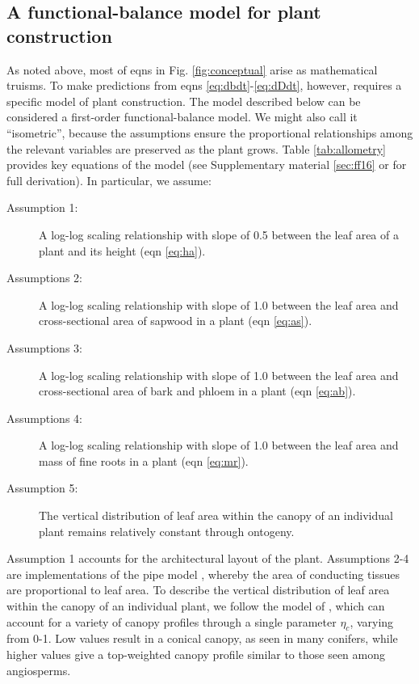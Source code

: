 \documentclass[a4paper,11pt]{article}
\begin{document}
\subsection{A functional-balance model for plant construction}

As noted above, most of eqns in Fig. \ref{fig:conceptual} arise as mathematical truisms. To make predictions from eqns \ref{eq:dbdt}-\ref{eq:dDdt}, however, requires a specific model of plant construction. The model described below can be considered a first-order functional-balance model. We might also call it ``isometric'', because the assumptions ensure the proportional relationships among the relevant variables are preserved as the plant grows. Table \ref{tab:allometry} provides key equations of the model (see Supplementary material \ref{sec:ff16} or \citet{Falster-2016} for full derivation). In particular, we assume:
\begin{description}
\item[Assumption 1:] A log-log scaling relationship with slope of 0.5 between the leaf area of a plant and its height (eqn \ref{eq:ha}).
\item[Assumptions 2:] A log-log scaling relationship with slope of 1.0 between the leaf area and cross-sectional area of sapwood in a plant (eqn \ref{eq:as}).
\item[Assumptions 3:] A log-log scaling relationship with slope of 1.0 between the leaf area and cross-sectional area of bark and phloem in a plant (eqn \ref{eq:ab}).
\item[Assumptions 4:] A log-log scaling relationship with slope of 1.0 between the leaf area and mass of fine roots in a plant (eqn \ref{eq:mr}).
\item[Assumption 5:] The vertical distribution of leaf area within the canopy of an individual plant remains relatively constant through ontogeny.
\end{description}

Assumption 1 accounts for the architectural layout of the plant. Assumptions 2-4 are implementations of the pipe model \citep{Shinozaki-1964}, whereby the area of conducting tissues are proportional to leaf area. To describe the vertical distribution of leaf area within the canopy of an individual plant, we follow the model of \citet{Yokozawa-1995}, which can account for a variety of canopy profiles through a single parameter $\eta_c$, varying from 0-1. Low values result in a conical canopy, as seen in many conifers, while higher values give a top-weighted canopy profile similar to those seen among angiosperms.
\end{document}
